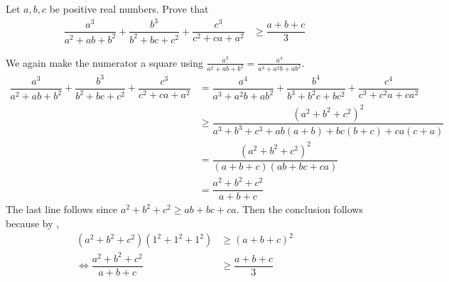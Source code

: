\documentclass{subfile}
\begin{document}
		\begin{problem}
			Let $a,b,c$ be positive real numbers. Prove that
				\begin{align*}
					\dfrac{a^{3}}{a^{2}+ab+b^{2}}+\dfrac{b^{3}}{b^{2}+bc+c^{2}}+\dfrac{c^{3}}{c^{2}+ca+a^{2}}
						& \geq \dfrac{a+b+c}{3}
				\end{align*}
				
				\begin{solution}
					We again make the numerator a square using $\frac{a^{3}}{a^{2}+ab+b^{2}}=\frac{a^{4}}{a^{3}+a^{2}b+ab^{2}}$.
						\begin{align*}
							\dfrac{a^{3}}{a^{2}+ab+b^{2}}+\dfrac{b^{3}}{b^{2}+bc+c^{2}}+\dfrac{c^{3}}{c^{2}+ca+a^{2}}
								& = \dfrac{a^{4}}{a^{3}+a^{2}b+ab^{2}}+\dfrac{b^{4}}{b^{3}+b^{2}c+bc^{2}}+\dfrac{c^{4}}{c^{3}+c^{2}a+ca^{2}}\\
								& \geq \dfrac{(a^{2}+b^{2}+c^{2})^{2}}{a^{3}+b^{3}+c^{3}+ab(a+b)+bc(b+c)+ca(c+a)}\\
								& = \dfrac{(a^{2}+b^{2}+c^{2})^{2}}{(a+b+c)(ab+bc+ca)}\\
								& = \dfrac{a^{2}+b^{2}+c^{2}}{a+b+c}
						\end{align*}
					The last line follows since $a^{2}+b^{2}+c^{2}\geq ab+bc+ca$. Then the conclusion follows because by ,
						\begin{align*}
							(a^{2}+b^{2}+c^{2})(1^{2}+1^{2}+1^{2})
								& \geq (a+b+c)^{2}\\
							\iff \dfrac{a^{2}+b^{2}+c^{2}}{a+b+c}
								& \geq \dfrac{a+b+c}{3}
						\end{align*}
				\end{solution}
		\end{problem}
	
\end{document}
